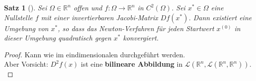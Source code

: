 \documentclass[ngerman,fontsize=11pt, paper=a4, parskip=half, titlepage=true, toc=bib]{scrbook}
\theoremstyle{definition}
\theoremstyle{plain}
\newtheorem{Satz}[Def]{Satz}		%
\newcommand{\R}{\mathds{R}}
\newcommand{\Ren}{\mathds{R}^{n}}
\newcommand{\subsectione}[1]{\addtocounter{Def}{1}\subsection{#1}}
\newenvironment{Satze}[1][]{ %
	\begin{Satz}[#1]
}
{
	\end{Satz}
	\addtocounter{subsection}{1}
}
\begin{document}
  \begin{Satze}
  	Sei $\Omega\in\R^n$ offen und $f:\Omega\rightarrow\Ren$ in $C^2(\Omega)$.
  	Sei $x^{*}\in\Omega $ eine Nullstelle $f$ mit einer invertierbaren Jacobi-Matrix $Df(x^{*})$.
  	Dann existiert eine Umgebung von $x^{*}$, so dass das Newton-Verfahren 
  	für jeden Startwert $x^{(0)}$ in dieser Umgebung
  	quadratisch gegen $x^{*}$ konvergiert.
  \end{Satze}
  
  \begin{proof}
    Kann wie im eindimensionalen durchgeführt werden.\\
    Aber Vorsicht: $D^2f(x)$ ist eine \textbf{bilineare Abbildung} in 
    $\mathcal{L}(\Ren, \mathcal{L}(\Ren, \Ren))$. \\
    

\end{proof}
\end{document}
